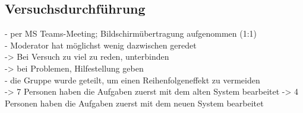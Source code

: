 \subsection{Versuchsdurchführung}
- per MS Teams-Meeting; Bildschirmübertragung aufgenommen (1:1)\\
- Moderator hat möglichst wenig dazwischen geredet\\
-> Bei Versuch zu viel zu reden, unterbinden\\
-> bei Problemen, Hilfestellung geben\\
- die Gruppe wurde geteilt, um einen Reihenfolgeneffekt \textcolor{red}{\cite{Quelle}} zu vermeiden\\
-> 7 Personen haben die Aufgaben zuerst mit dem alten System bearbeitet
-> 4 Personen haben die Aufgaben zuerst mit dem neuen System bearbeitet
